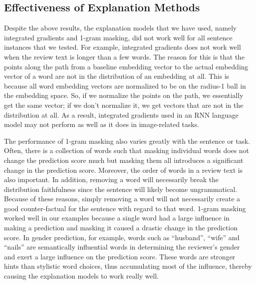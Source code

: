 \subsection{Effectiveness of Explanation Methods}

Despite the above results, the explanation models that we have used, namely integrated gradients and 1-gram masking, did not work well for all sentence instances that we tested. For example, integrated gradients does not work well when the review text is longer than a few words. The reason for this is that the points along the path from a baseline embedding vector to the actual embedding vector of a word are not in the distribution of an embedding at all. This is because all word embedding vectors are normalized to be on the radius-1 ball in the embedding space. So, if we normalize the points on the path, we essentially get the same vector; if we don't normalize it, we get vectors that are not in the distribution at all. As a result, integrated gradients used in an RNN language model may not perform as well as it does in image-related tasks.

The performance of 1-gram masking also varies greatly with the sentence or task. Often, there is a collection of words such that masking individual words does not change the prediction score much but masking them all introduces a significant change in the prediction score. Moreover, the order of words in a review text is also important. In addition, removing a word will necessarily break the distribution faithfulness since the sentence will likely become ungrammatical. Because of these reasons, simply removing a word will not necessarily create a good counter-factual for the sentence with regard to that word. 1-gram masking worked well in our examples because a single word had a large influence in making a prediction and masking it caused a drastic change in the prediction score. In gender prediction, for example, words such as ``husband'', ``wife'' and ``nails'' are semantically influential words in determining the reviewer's gender and exert a large influence on the prediction score. These words are stronger hints than stylistic word choices, thus accumulating most of the influence, thereby causing the explanation models to work really well.

